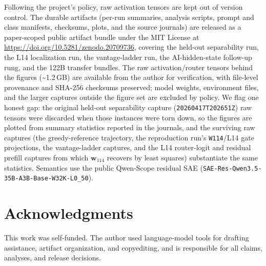 \documentclass[10pt,a4paper,twocolumn]{article}
\newcommand{\wvec}{\mathbf{w}_{114}}
\begin{document}
Following the project's policy, raw activation tensors are kept out of version
control. The durable artifacts (per-run summaries, analysis scripts, prompt and
class manifests, checksums, plots, and the source journals) are released as a
paper-scoped public artifact bundle under the MIT License at
\url{https://doi.org/10.5281/zenodo.20709736}, covering the held-out
separability run, the L14 localization run, the vantage-ladder run, the
AI-hidden-state follow-up rung, and the 122B transfer bundles. The raw
activation/router tensors behind the figures
(\textasciitilde1.2\,GB) are available from the author for verification, with
file-level provenance and SHA-256 checksums preserved; model weights, environment
files, and the larger captures outside the figure set are excluded by policy. We flag one
honest gap: the original held-out separability capture
(\texttt{20260417T202651Z}) raw tensors were discarded when those instances were
torn down, so the figures are plotted from summary statistics reported in the
journals, and the surviving raw captures (the greedy-reference trajectory, the
reproduction run's \texttt{W114}/L14 gate projections, the vantage-ladder
captures, and the L14 router-logit and residual prefill captures from which
$\wvec$ recovers by least squares) substantiate the same statistics. Semantics
use the public Qwen-Scope residual SAE
(\texttt{SAE-Res-Qwen3.5-35B-A3B-Base-W32K-L0\_50}).

\section*{Acknowledgments}

This work was self-funded. The author used language-model tools for drafting
assistance, artifact organization, and copyediting, and is responsible for all
claims, analyses, and release decisions.
\end{document}
